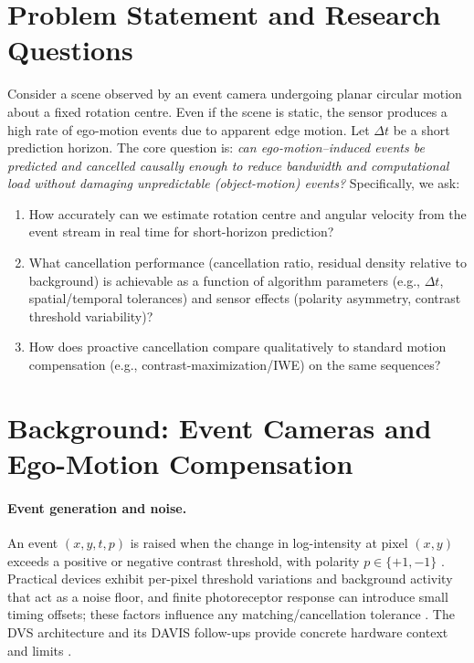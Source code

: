 \section{Problem Statement and Research Questions}

Consider a scene observed by an event camera undergoing planar circular motion about a fixed rotation centre. Even if the scene is static, the sensor produces a high rate of ego-motion events due to apparent edge motion. Let $\Delta t$ be a short prediction horizon. The core question is: \emph{can ego-motion–induced events be predicted and cancelled causally enough to reduce bandwidth and computational load without damaging unpredictable (object-motion) events?} Specifically, we ask:
\begin{enumerate}
    \item How accurately can we estimate rotation centre and angular velocity from the event stream in real time for short-horizon prediction? \cite{Gallego2017Angular,Gallego2018CMax}
    \item What cancellation performance (cancellation ratio, residual density relative to background) is achievable as a function of algorithm parameters (e.g., $\Delta t$, spatial/temporal tolerances) and sensor effects (polarity asymmetry, contrast threshold variability)? \cite{Gallego2020Survey,Xu2020TCI}
    \item How does proactive cancellation compare qualitatively to standard motion compensation (e.g., contrast-maximization/IWE) on the same sequences? \cite{Gallego2018CMax,Bardow2016SOFIE,Stoffregen2019Segmentation}
\end{enumerate}

\section{Background: Event Cameras and Ego-Motion Compensation}

\paragraph{Event generation and noise.}
An event $(x,y,t,p)$ is raised when the change in log-intensity at pixel $(x,y)$ exceeds a positive or negative contrast threshold, with polarity $p \in \{+1,-1\}$ \cite{Gallego2020Survey}. Practical devices exhibit per-pixel threshold variations and background activity that act as a noise floor, and finite photoreceptor response can introduce small timing offsets; these factors influence any matching/cancellation tolerance \cite{Gallego2020Survey}. The DVS architecture and its DAVIS follow-ups provide concrete hardware context and limits \cite{Lichtsteiner2008DVS,Brandli2014DAVIS}.

